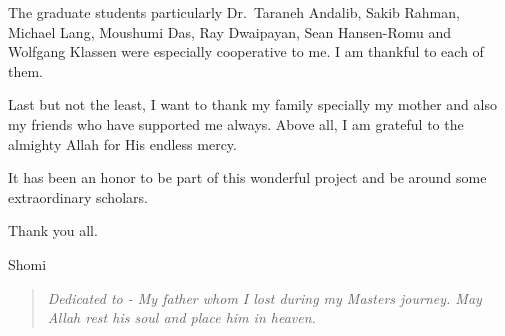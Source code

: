 \begin{acknowledgments}
The graduate students particularly Dr.~Taraneh Andalib, Sakib Rahman, Michael Lang, Moushumi Das, Ray Dwaipayan, Sean Hansen-Romu and Wolfgang Klassen were especially cooperative to me. I am thankful to each of them. 

Last but not the least, I want to thank my family specially my mother and also my friends who have supported me always. Above all, I am grateful to the almighty Allah for His endless mercy.

It has been an honor to be part of this wonderful project and be around some extraordinary scholars.

\vspace{2em}
Thank you all.

Shomi

\end{acknowledgments}

%



\dedication
\vspace*{\fill}
\begin{center}
\begin{quote}
\hfil \hsp \Large \em Dedicated to - My father whom I lost during my Masters journey. May Allah rest his soul and place him in heaven.\hfil
\end{quote}
\vspace*{\fill}
\end{center}
\newpage
\cleardoublepage
\thispagestyle{empty}
\startarabicpagination
